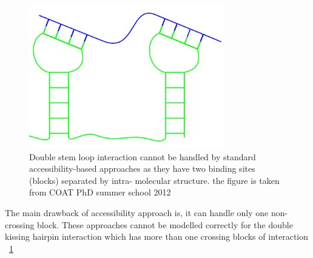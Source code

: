 \documentclass[twoside,a4paper]{report}
\numberwithin{equation}{section}
\begin{document}
		\begin{figure}[tb]
		\includegraphics[width=0.4\linewidth]{doublestem}
		\centering
		\caption{ Double stem loop interaction cannot be handled by standard accessibility-based approaches as they have two binding sites (blocks) separated by intra- molecular structure. the figure is taken from COAT PhD summer school 2012} 
		\label{Fig:doublestem}
	\end{figure}
	
	
	The main drawback of accessibility approach is, it can handle only one non-crossing block. These approaches cannot be modelled correctly for the double kissing hairpin interaction which has more than one crossing blocks of interaction ~\ref{Fig:doublestem}\\
	
	
\end{document}
